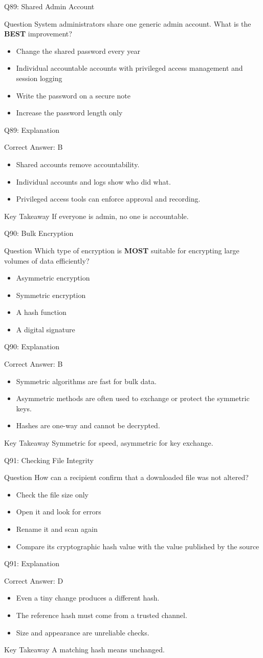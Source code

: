 \documentclass[aspectratio=169]{beamer}
\newcommand{\hq}[7]{%
	\begin{frame}{Q#1: #2}
		\begin{block}{Question}
			#3
		\end{block}
		\begin{itemize}
			#4
		\end{itemize}
	\end{frame}
	\begin{frame}{Q#1: Explanation}
		\begin{block}{Correct Answer: #5}
			\begin{itemize}
				#6
			\end{itemize}
		\end{block}
		\begin{alertblock}{Key Takeaway}
			#7
		\end{alertblock}
	\end{frame}
}
\begin{document}
	\hq{89}{Shared Admin Account}
	{System administrators share one generic admin account. What is the \textbf{BEST} improvement?}
	{\item[\textbf{(A)}] Change the shared password every year
		\item[\textbf{(B)}] Individual accountable accounts with privileged access management and session logging
		\item[\textbf{(C)}] Write the password on a secure note
		\item[\textbf{(D)}] Increase the password length only}
	{B}
	{\item Shared accounts remove accountability.
		\item Individual accounts and logs show who did what.
		\item Privileged access tools can enforce approval and recording.}
	{If everyone is admin, no one is accountable.}
	
	\hq{90}{Bulk Encryption}
	{Which type of encryption is \textbf{MOST} suitable for encrypting large volumes of data efficiently?}
	{\item[\textbf{(A)}] Asymmetric encryption
		\item[\textbf{(B)}] Symmetric encryption
		\item[\textbf{(C)}] A hash function
		\item[\textbf{(D)}] A digital signature}
	{B}
	{\item Symmetric algorithms are fast for bulk data.
		\item Asymmetric methods are often used to exchange or protect the symmetric keys.
		\item Hashes are one-way and cannot be decrypted.}
	{Symmetric for speed, asymmetric for key exchange.}
	
	\hq{91}{Checking File Integrity}
	{How can a recipient confirm that a downloaded file was not altered?}
	{\item[\textbf{(A)}] Check the file size only
		\item[\textbf{(B)}] Open it and look for errors
		\item[\textbf{(C)}] Rename it and scan again
		\item[\textbf{(D)}] Compare its cryptographic hash value with the value published by the source}
	{D}
	{\item Even a tiny change produces a different hash.
		\item The reference hash must come from a trusted channel.
		\item Size and appearance are unreliable checks.}
	{A matching hash means unchanged.}
	
\end{document}
